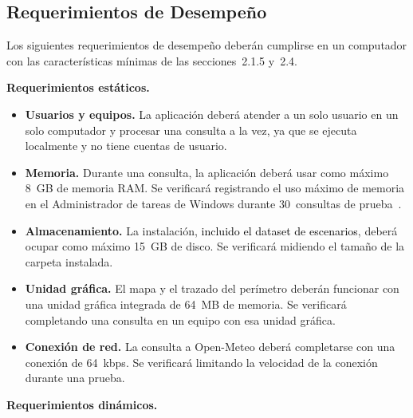 \subsection{Requerimientos de Desempeño}
Los siguientes requerimientos de desempeño deberán cumplirse en un computador con las características mínimas de las secciones~2.1.5 y~2.4.

\textbf{Requerimientos estáticos.}

\begin{itemize}
  \item \textbf{Usuarios y equipos.} La aplicación deberá atender a un solo usuario en un solo computador y procesar una consulta a la vez, ya que se ejecuta localmente y no tiene cuentas de usuario.
  \item \textbf{Memoria.} Durante una consulta, la aplicación deberá usar como máximo 8~GB de memoria RAM. Se verificará registrando el uso máximo de memoria en el Administrador de tareas de Windows durante 30~consultas de prueba~\cite{vitoriano2021probabilidad}.
  \item \textbf{Almacenamiento.} La instalación, \textcolor{black}{incluido el dataset de escenarios}, deberá ocupar como máximo 15~GB de disco. Se verificará midiendo el tamaño de la carpeta instalada.
  \item \textbf{Unidad gráfica.} El mapa y el trazado del perímetro deberán funcionar con una unidad gráfica integrada de 64~MB de memoria. Se verificará completando una consulta en un equipo con esa unidad gráfica.
  \item \textbf{Conexión de red.} La consulta a Open-Meteo deberá completarse con una conexión de 64~kbps. Se verificará limitando la velocidad de la conexión durante una prueba.
\end{itemize}

\textbf{Requerimientos dinámicos.}


